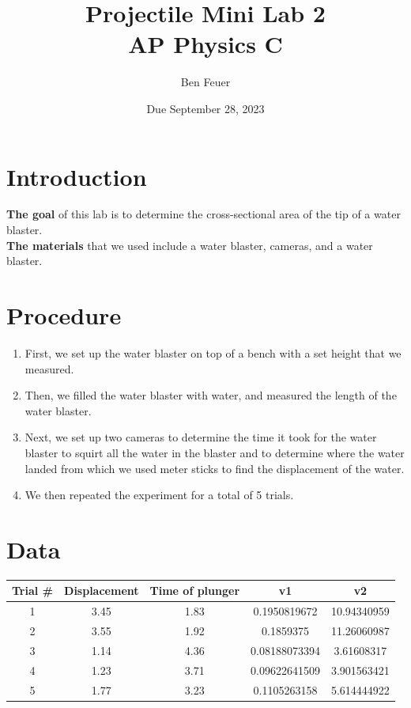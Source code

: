 \documentclass{report}
\title{\Huge{Projectile Mini Lab 2}\\AP Physics C}
\author{\huge{Ben Feuer}}
\date{Due September 28, 2023}
\begin{document}
\maketitle
\newpage%
\pagebreak

\section*{Introduction}

\textbf{The goal} of this lab is to determine the cross-sectional area of the tip of a water blaster. 
\\
\textbf{The materials} that we used include a water blaster, cameras, and a water blaster.

\section*{Procedure}

\begin{enumerate}
  \item First, we set up the water blaster on top of a bench with a set height that we measured.
  \item  Then, we filled the water blaster with water, and measured the length of the water blaster. 
  \item Next, we set up two cameras to determine the time it took for the water blaster to squirt all the water in the blaster and to determine where the water landed from which we used meter sticks to find the displacement of the  water. 
  \item We then repeated the experiment for a total of 5 trials. 
\end{enumerate}


\section*{Data}


\begin{center}
  \begin{tabular}{|c|c|c|c|c|}
\hline
Trial \# & Displacement & Time of plunger & v1            & v2          \\
\hline
1        & 3.45         & 1.83            & 0.1950819672  & 10.94340959 \\
\hline
2        & 3.55         & 1.92            & 0.1859375     & 11.26060987 \\
\hline
3        & 1.14         & 4.36            & 0.08188073394 & 3.61608317  \\
\hline
4        & 1.23         & 3.71            & 0.09622641509 & 3.901563421 \\
\hline
5        & 1.77         & 3.23            & 0.1105263158  & 5.614444922 \\
\hline
\end{tabular}
\end{center}
\end{document}
